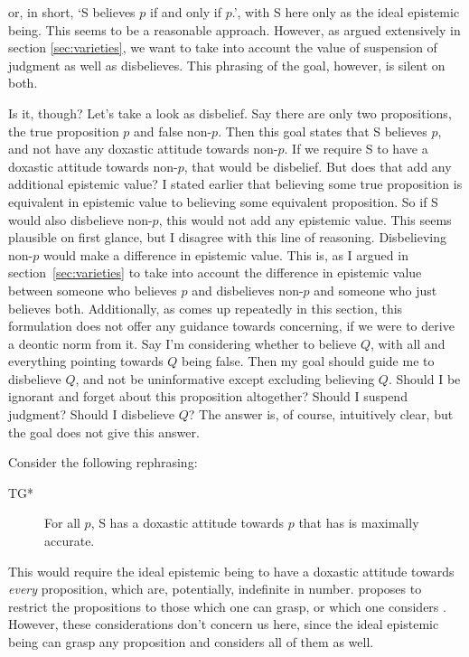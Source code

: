 \documentclass[12pt,numbers=noenddot]{scrartcl}
\begin{document}
or, in short, ‘S believes $p$ if and only if $p$.’, with S here only as the ideal epistemic being. This seems to be a reasonable approach. However, as argued extensively in section \ref{sec:varieties}, we want to take into account the value of suspension of judgment as well as disbelieves. This phrasing of the goal, however, is silent on both. 

Is it, though? Let's take a look as disbelief. Say there are only two propositions, the true proposition $p$ and false non-$p$. Then this goal states that S believes $p$, and not have any doxastic attitude towards non-$p$. If we require S to have a doxastic attitude towards non-$p$, that would be disbelief. But does that add any additional epistemic value? I stated earlier that believing some true proposition is equivalent in epistemic value to believing some equivalent proposition. So if S would also disbelieve non-$p$, this would not add any epistemic value. This seems plausible on first glance, but I disagree with this line of reasoning. Disbelieving non-$p$ would make a difference in epistemic value. This is, as I argued in section \ref{sec:varieties} to take into account the difference in epistemic value between someone who believes $p$ and disbelieves non-$p$ and someone who just believes both. Additionally, as comes up repeatedly in this section, this formulation does not offer any guidance towards concerning, if we were to derive a deontic norm from it. Say I'm considering whether to believe $Q$, with all and everything pointing towards $Q$ being false. Then my goal should guide me to disbelieve $Q$, and not be uninformative except excluding believing $Q$. Should I be ignorant and forget about this proposition altogether? Should I suspend judgment? Should I disbelieve $Q$? The answer is, of course, intuitively clear, but the goal does not give this answer. 

Consider the following rephrasing:

\begin{description}
    \item[TG*] For all $p$, S has a doxastic attitude towards $p$ that has is maximally accurate.
\end{description}

This would require the ideal epistemic being to have a doxastic attitude towards \emph{every} proposition, which are, potentially, indefinite in number. \textcite[159]{David2001-DAVTAT-7} proposes to restrict the propositions to those which one can grasp, or which one considers \autocite[17]{Chisholm1966-CHITOK}. However, these considerations don't concern us here, since the ideal epistemic being can grasp any proposition and considers all of them as well.
\end{document}
